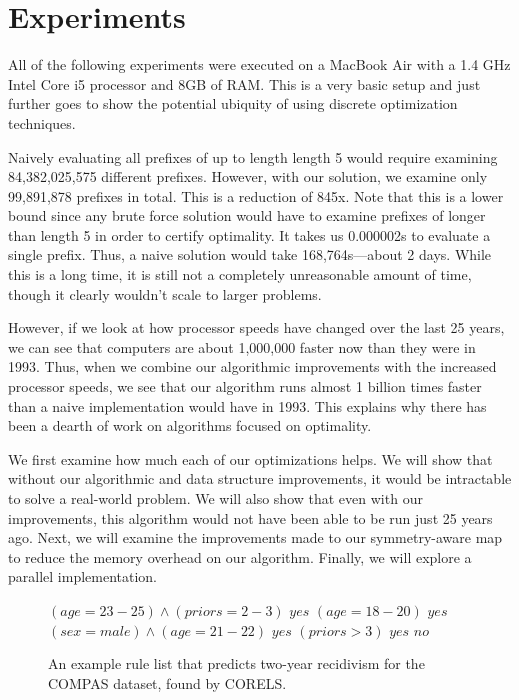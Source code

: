 \chapter{Experiments}

All of the following experiments were executed on a MacBook Air with a 1.4 GHz Intel Core i5 processor and 8GB of RAM.
This is a very basic setup and just further goes to show the potential ubiquity of using discrete optimization techniques.


Naively evaluating all prefixes of up to length length 5 would require examining 84,382,025,575 different prefixes.
However, with our solution, we examine only 99,891,878 prefixes in total.
This is a reduction of 845x.
Note that this is a lower bound since any brute force solution would have to examine prefixes of longer than length 5 in order to certify optimality.
It takes us 0.000002s to evaluate a single prefix.
Thus, a naive solution would take 168,764s---about 2 days.
While this is a long time, it is still not a completely unreasonable amount of time, though it clearly wouldn't scale to larger problems.

However, if we look at how processor speeds have changed over the last 25 years, we can see that computers are about 1,000,000 faster now than they were in 1993. \cite{Supercomputer}
Thus, when we combine our algorithmic improvements with the increased processor speeds, we see that our algorithm runs almost 1 billion times faster than a naive implementation would have in 1993.
This explains why there has been a dearth of work on algorithms focused on optimality.

We first examine how much each of our optimizations helps.
We will show that without our algorithmic and data structure improvements, it would be intractable to solve a real-world problem.
We will also show that even with our improvements, this algorithm would not have been able to be run just 25 years ago.
Next, we will examine the improvements made to our symmetry-aware map to reduce the memory overhead on our algorithm.
Finally, we will explore a parallel implementation.

\begin{figure}[t!]
\begin{algorithmic}
\normalsize
\State \bif $(age=23-25) \wedge (priors=2-3)$ \bthen $yes$
\State \belif $(age=18-20)$ \bthen $yes$
\State \belif $(sex=male) \wedge (age=21-22)$ \bthen $yes$
\State \belif $(priors>3)$ \bthen $yes$
\State \belse $no$
\end{algorithmic}
\caption{An example rule list that predicts two-year recidivism for the COMPAS dataset, found by CORELS.}
\label{fig:rule-list}
\end{figure}

